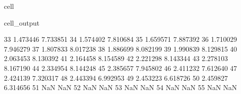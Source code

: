 \documentclass[letterpaper,10pt,english]{jupyterBook}
\begin{document}
\begin{sphinxuseclass}{cell}
\begin{sphinxVerbatimOutput}
\begin{sphinxuseclass}{cell_output}
\begin{sphinxVerbatim}[commandchars=\\\{\}]
					33                1.473446                    \PYGZhy{}7.733851   
					34                1.574402                    \PYGZhy{}7.810684   
					35                1.659571                    \PYGZhy{}7.887392   
					36                1.710029                    \PYGZhy{}7.946279   
					37                1.807833                    \PYGZhy{}8.017238   
					38                1.886699                    \PYGZhy{}8.082199   
					39                1.990839                    \PYGZhy{}8.129815   
					40                2.063453                    \PYGZhy{}8.130392   
					41                2.164458                    \PYGZhy{}8.154589   
					42                2.221298                    \PYGZhy{}8.143344   
					43                2.278103                    \PYGZhy{}8.167190   
					44                2.334954                    \PYGZhy{}8.144248   
					45                2.385657                    \PYGZhy{}7.945802   
					46                2.411232                    \PYGZhy{}7.612640   
					47                2.424139                    \PYGZhy{}7.320317   
					48                2.443394                    \PYGZhy{}6.992953   
					49                2.453223                    \PYGZhy{}6.618726   
					50                2.459827                    \PYGZhy{}6.314656   
					51                     NaN                          NaN   
					52                     NaN                          NaN   
					53                     NaN                          NaN   
					54                     NaN                          NaN   
					55                     NaN                          NaN   
					

\end{sphinxVerbatim}
\end{sphinxuseclass}
\end{sphinxVerbatimOutput}
\end{sphinxuseclass}
\end{document}

